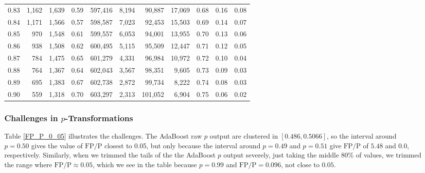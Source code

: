 \begin{table}[h]
\begin{tabular}{
	*{3}{>{\normalfont\normalsize}r}
	*{1}{>{\normalfont\normalsize}c}
	*{7}{>{\normalfont\normalsize}r}
}
0.83 &   1,162 &  1,639 &                                       0.59 &  597,416 &    8,194 &   90,887 &   17,069 &  0.68 &  0.16 &                         0.08 \\
0.84 &   1,171 &  1,566 &                                       0.57 &  598,587 &    7,023 &   92,453 &   15,503 &  0.69 &  0.14 &                         0.07 \\
0.85 &     970 &  1,548 &                                       0.61 &  599,557 &    6,053 &   94,001 &   13,955 &  0.70 &  0.13 &                         0.06 \\
0.86 &     938 &  1,508 &                                       0.62 &  600,495 &    5,115 &   95,509 &   12,447 &  0.71 &  0.12 &                         0.05 \\
0.87 &     784 &  1,475 &                                       0.65 &  601,279 &    4,331 &   96,984 &   10,972 &  0.72 &  0.10 &                         0.04 \\
0.88 &     764 &  1,367 &                                       0.64 &  602,043 &    3,567 &   98,351 &    9,605 &  0.73 &  0.09 &                         0.03 \\
0.89 &     695 &  1,383 &                                       0.67 &  602,738 &    2,872 &   99,734 &    8,222 &  0.74 &  0.08 &                         0.03 \\
0.90 &     559 &  1,318 &                                       0.70 &  603,297 &    2,313 &  101,052 &    6,904 &  0.75 &  0.06 &                         0.02 \\
\bottomrule
\end{tabular}
\end{table}

\FloatBarrier

\subsubsection{Challenges in $p$-Transformations}
\label{challenges_transformations}

Table \ref{FP_P_0_05} illustrates the challenges.  The AdaBoost raw $p$ output are clustered in $[0.486,0.5066]$, so the interval around $p = 0.50$ gives the value of $\text{FP} / \text{P}$ closest to 0.05, but only because the interval around $p=0.49$ and $p=0.51$ give $\text{FP} / \text{P}$ of $5.48$ and $0.0$, respectively.   Similarly, when we trimmed the tails of the the AdaBoost $p$ output severely, just taking the middle 80\% of values, we trimmed the range where $\text{FP} / \text{P} \approx 0.05$, which we see in the table because $p = 0.99$ and $\text{FP} / \text{P} = 0.096$, not close to $0.05$.  

